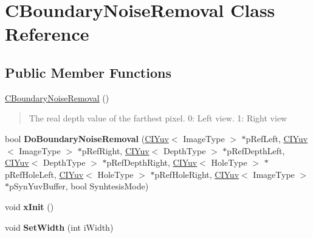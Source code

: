 \hypertarget{class_c_boundary_noise_removal}{}\section{C\+Boundary\+Noise\+Removal Class Reference}
\label{class_c_boundary_noise_removal}
\subsection*{Public Member Functions}
\begin{DoxyCompactItemize}
\item 
\mbox{\label{class_c_boundary_noise_removal_af789fb697fbb2919763b302dd7a1f59b}} 
\hyperlink{class_c_boundary_noise_removal_af789fb697fbb2919763b302dd7a1f59b}{C\+Boundary\+Noise\+Removal} ()
\begin{DoxyCompactList}\small\item\em \begin{quote}
The real depth value of the farthest pixel. 0\+: Left view. 1\+: Right view \end{quote}
\end{DoxyCompactList}\item 
\mbox{\label{class_c_boundary_noise_removal_a441713ad025973e9592dcd4b1825b1e3}} 
bool {\bfseries Do\+Boundary\+Noise\+Removal} (\hyperlink{class_c_i_yuv}{C\+I\+Yuv}$<$ Image\+Type $>$ $\ast$p\+Ref\+Left, \hyperlink{class_c_i_yuv}{C\+I\+Yuv}$<$ Image\+Type $>$ $\ast$p\+Ref\+Right, \hyperlink{class_c_i_yuv}{C\+I\+Yuv}$<$ Depth\+Type $>$ $\ast$p\+Ref\+Depth\+Left, \hyperlink{class_c_i_yuv}{C\+I\+Yuv}$<$ Depth\+Type $>$ $\ast$p\+Ref\+Depth\+Right, \hyperlink{class_c_i_yuv}{C\+I\+Yuv}$<$ Hole\+Type $>$ $\ast$p\+Ref\+Hole\+Left, \hyperlink{class_c_i_yuv}{C\+I\+Yuv}$<$ Hole\+Type $>$ $\ast$p\+Ref\+Hole\+Right, \hyperlink{class_c_i_yuv}{C\+I\+Yuv}$<$ Image\+Type $>$ $\ast$p\+Syn\+Yuv\+Buffer, bool Synhtesis\+Mode)
\item 
\mbox{\label{class_c_boundary_noise_removal_a1c1e4f5b6dd8ada3c20dbcaea0d55be7}} 
void {\bfseries x\+Init} ()
\item 
\mbox{\label{class_c_boundary_noise_removal_a7a222f7088dc78c75bd89b89c5843edf}} 
void {\bfseries Set\+Width} (int i\+Width)

\end{DoxyCompactItemize}
